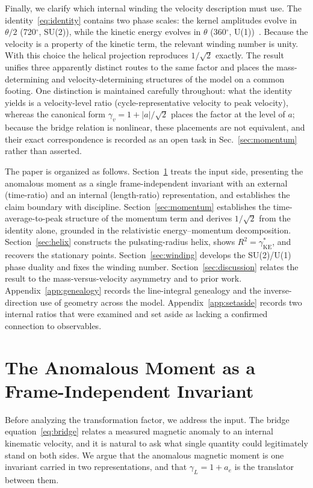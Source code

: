 \documentclass[%
 reprint, amsmath,amssymb, aps, prb, ]{revtex4-2}
\numberwithin{equation}{section}
\newcommand{\gKE}{\gamma^{*}_{\text{KE}}}
\begin{document}
Finally, we clarify which internal winding the velocity description must use. The identity~\eqref{eq:identity} contains two phase scales: the kernel amplitudes evolve in $\theta/2$ (720$^\circ$, SU(2)), while the kinetic energy evolves in $\theta$ (360$^\circ$, U(1))~\cite{hanamura01,hanamura19}. Because the velocity is a property of the kinetic term, the relevant winding number is unity. With this choice the helical projection reproduces $1/\sqrt{2}$ exactly. The result unifies three apparently distinct routes to the same factor and places the mass-determining and velocity-determining structures of the model on a common footing. One distinction is maintained carefully throughout: what the identity yields is a velocity-level ratio (cycle-representative velocity to peak velocity), whereas the canonical form $\gamma_v = 1+\lvert a\rvert/\sqrt{2}$ places the factor at the level of $a$; because the bridge relation is nonlinear, these placements are not equivalent, and their exact correspondence is recorded as an open task in Sec.~\ref{sec:momentum} rather than asserted.

The paper is organized as follows. Section~\ref{sec:duality-rep} treats the input side, presenting the anomalous moment as a single frame-independent invariant with an external (time-ratio) and an internal (length-ratio) representation, and establishes the claim boundary with discipline. Section~\ref{sec:momentum} establishes the time-average-to-peak structure of the momentum term and derives $1/\sqrt{2}$ from the identity alone, grounded in the relativistic energy--momentum decomposition. Section~\ref{sec:helix} constructs the pulsating-radius helix, shows $R^2=\gKE$, and recovers the stationary points. Section~\ref{sec:winding} develops the SU(2)/U(1) phase duality and fixes the winding number. Section~\ref{sec:discussion} relates the result to the mass-versus-velocity asymmetry and to prior work. Appendix~\ref{app:genealogy} records the line-integral genealogy and the inverse-direction use of geometry across the model. Appendix~\ref{app:setaside} records two internal ratios that were examined and set aside as lacking a confirmed connection to observables.

\section{The Anomalous Moment as a Frame-Independent Invariant}
\label{sec:duality-rep}

Before analyzing the transformation factor, we address the input. The bridge equation~\eqref{eq:bridge} relates a measured magnetic anomaly to an internal kinematic velocity, and it is natural to ask what single quantity could legitimately stand on both sides. We argue that the anomalous magnetic moment is one invariant carried in two representations, and that $\gamma_L = 1 + a_e$ is the translator between them.
\end{document}
